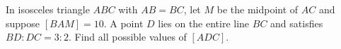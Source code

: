 In isosceles triangle $ABC$ with $AB=BC$, let $M$ be the midpoint of $AC$ and suppose $[BAM]=10$. A point $D$ lies on the entire line $BC$ and satisfies $BD:DC=3:2$. Find all possible values of $[ADC]$.
